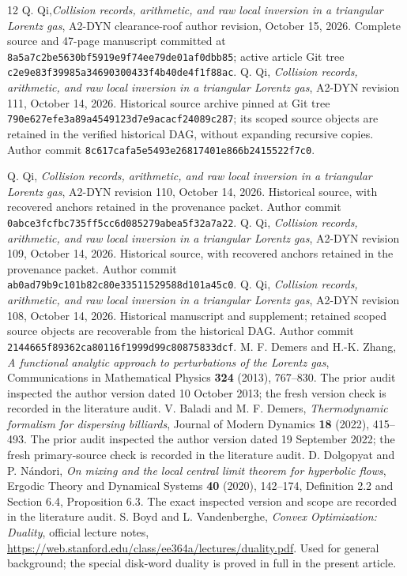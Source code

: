 \documentclass[11pt,reqno]{amsart}
\numberwithin{equation}{section}
\theoremstyle{definition}\newtheorem{definition}[theorem]{Definition}
\theoremstyle{remark}\newtheorem{remark}[theorem]{Remark}
\begin{document}








\begin{thebibliography}{12}
 Q. Qi,\emph{Collision records, arithmetic, and raw local inversion in a
triangular Lorentz gas}, A2-DYN clearance-roof author revision,
October 15, 2026. Complete source and 47-page manuscript
committed at \texttt{8a5a7c2be5630bf5919e9f74ee79de01af0dbb85};
active article Git tree \texttt{c2e9e83f39985a34690300433f4b40de4f1f88ac}.
 Q. Qi,
\emph{Collision records, arithmetic, and raw local inversion in a
triangular Lorentz gas}, A2-DYN revision 111, October 14, 2026.
Historical source archive pinned at Git tree \texttt{790e627efe3a89a4549123d7e9acacf24089c287}; its scoped source objects are retained in the verified historical DAG, without expanding recursive copies.
Author commit \texttt{8c617cafa5e5493e26817401e866b2415522f7c0}.

 Q. Qi,
\emph{Collision records, arithmetic, and raw local inversion in a
triangular Lorentz gas}, A2-DYN revision 110, October 14, 2026.
Historical source, with recovered anchors retained in the provenance packet.
Author commit \texttt{0abce3fcfbc735ff5cc6d085279abea5f32a7a22}.
 Q. Qi,
\emph{Collision records, arithmetic, and raw local inversion in a
triangular Lorentz gas}, A2-DYN revision 109, October 14, 2026.
Historical source, with recovered anchors retained in the provenance packet.
Author commit \texttt{ab0ad79b9c101b82c80e33511529588d101a45c0}.
 Q. Qi,
\emph{Collision records, arithmetic, and raw local inversion in a
triangular Lorentz gas}, A2-DYN revision 108, October 14, 2026.
Historical manuscript and supplement; retained scoped source objects are recoverable from the historical DAG. Author commit
\texttt{2144665f89362ca80116f1999d99c80875833dcf}.
 M. F. Demers and H.-K. Zhang,
\emph{A functional analytic approach to perturbations of the Lorentz gas},
Communications in Mathematical Physics \textbf{324} (2013), 767--830.
The prior audit inspected the author version dated 10 October 2013; the fresh version check is recorded in the literature audit.
 V. Baladi and M. F. Demers,
\emph{Thermodynamic formalism for dispersing billiards},
Journal of Modern Dynamics \textbf{18} (2022), 415--493.
The prior audit inspected the author version dated 19 September 2022; the fresh primary-source check is recorded in the literature audit.
 D. Dolgopyat and P. N\'andori,
\emph{On mixing and the local central limit theorem for hyperbolic flows},
Ergodic Theory and Dynamical Systems \textbf{40} (2020), 142--174,
Definition 2.2 and Section 6.4, Proposition 6.3. The exact inspected
version and scope are recorded in the literature audit.
 S. Boyd and L. Vandenberghe,
\emph{Convex Optimization: Duality}, official lecture notes,
\url{https://web.stanford.edu/class/ee364a/lectures/duality.pdf}.
Used for general background; the special disk-word duality is proved
in full in the present article.
\end{thebibliography}
\end{document}
